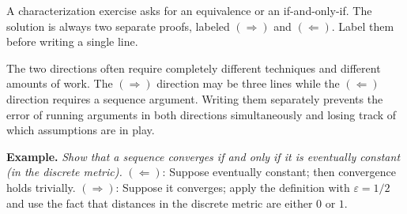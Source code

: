 \begin{remark}
A characterization exercise asks for an equivalence or an if-and-only-if.
The solution is always two separate proofs, labeled $(\Rightarrow)$ and
$(\Leftarrow)$. Label them before writing a single line.

The two directions often require completely different techniques and
different amounts of work. The $(\Rightarrow)$ direction may be three
lines while the $(\Leftarrow)$ direction requires a sequence argument.
Writing them separately prevents the error of running arguments in
both directions simultaneously and losing track of which assumptions
are in play.

\textbf{Example.} \textit{Show that a sequence converges if and only if
it is eventually constant (in the discrete metric).}
$(\Leftarrow)$: Suppose eventually constant; then convergence holds trivially.
$(\Rightarrow)$: Suppose it converges; apply the definition with
$\varepsilon = 1/2$ and use the fact that distances in the discrete metric
are either $0$ or $1$.
\end{remark}
